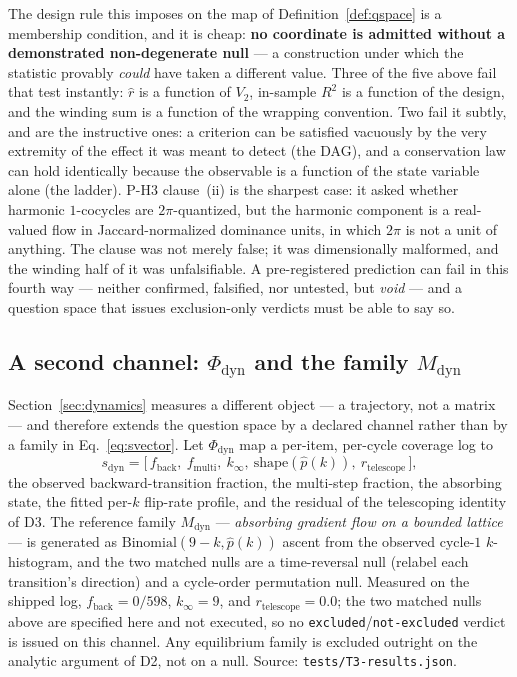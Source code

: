 \documentclass[11pt,a4paper]{article}
\theoremstyle{plain}
\theoremstyle{remark}
\theoremstyle{plain}
\begin{document}
The design rule this imposes on the map of Definition~\ref{def:qspace} is a
membership condition, and it is cheap: \textbf{no coordinate is admitted without a
demonstrated non-degenerate null} --- a construction under which the statistic
provably \emph{could} have taken a different value. Three of the five above fail
that test instantly: $\hat r$ is a function of $V_2$, in-sample $R^2$ is a
function of the design, and the winding sum is a function of the wrapping
convention. Two fail it subtly, and are the instructive ones: a criterion can be
satisfied vacuously by the very extremity of the effect it was meant to detect
(the DAG), and a conservation law can hold identically because the observable is a
function of the state variable alone (the ladder). P-H3 clause~(ii) is the sharpest
case: it asked whether harmonic $1$-cocycles are $2\pi$-quantized, but the
harmonic component is a real-valued flow in Jaccard-normalized dominance units, in
which $2\pi$ is not a unit of anything. The clause was not merely false; it was
dimensionally malformed, and the winding half of it was unfalsifiable. A
pre-registered prediction can fail in this fourth way --- neither confirmed,
falsified, nor untested, but \emph{void} --- and a question space that issues
exclusion-only verdicts must be able to say so.

\subsection{A second channel: $\Phi_\mathrm{dyn}$ and the family $M_\mathrm{dyn}$}

Section~\ref{sec:dynamics} measures a different object --- a trajectory, not a
matrix --- and therefore extends the question space by a declared channel rather
than by a family in Eq.~\eqref{eq:svector}. Let $\Phi_\mathrm{dyn}$ map a per-item,
per-cycle coverage log to
\[
s_\mathrm{dyn}=\big[\,f_\mathrm{back},\ f_\mathrm{multi},\ k_\infty,\
\mathrm{shape}(\hat p(k)),\ r_\mathrm{telescope}\,\big],
\]
the observed backward-transition fraction, the multi-step fraction, the absorbing
state, the fitted per-$k$ flip-rate profile, and the residual of the telescoping
identity of D3. The reference family $M_\mathrm{dyn}$ --- \emph{absorbing gradient
flow on a bounded lattice} --- is generated as $\mathrm{Binomial}(9-k,\hat p(k))$
ascent from the observed cycle-$1$ $k$-histogram, and the two matched nulls are a
time-reversal null (relabel each transition's direction) and a cycle-order
permutation null. Measured on the shipped log, $f_\mathrm{back}=0/598$, $k_\infty=9$, and $r_\mathrm{telescope}=0.0$; the two matched nulls above are specified here and not executed, so no \texttt{excluded}/\texttt{not-excluded} verdict is issued on this channel. Any equilibrium family is excluded outright on the analytic argument of D2, not on a null. Source: \texttt{tests/T3-results.json}.
\end{document}
